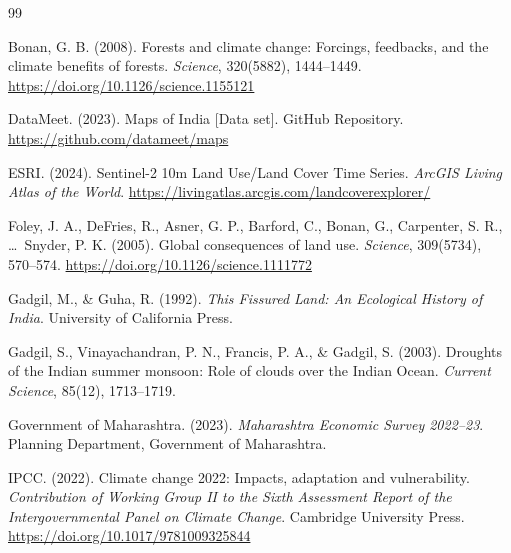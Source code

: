 \documentclass[12pt,a4paper]{article}
\begin{document}
\newpage


\begin{thebibliography}{99}

Bonan, G. B. (2008).
\newblock Forests and climate change: Forcings, feedbacks, and the climate benefits of forests.
\newblock \textit{Science}, 320(5882), 1444--1449.
\newblock \url{https://doi.org/10.1126/science.1155121}

DataMeet. (2023).
\newblock Maps of India [Data set].
\newblock GitHub Repository. \url{https://github.com/datameet/maps}

ESRI. (2024).
\newblock Sentinel-2 10m Land Use/Land Cover Time Series.
\newblock \textit{ArcGIS Living Atlas of the World}. \url{https://livingatlas.arcgis.com/landcoverexplorer/}

Foley, J. A., DeFries, R., Asner, G. P., Barford, C., Bonan, G., Carpenter, S. R., \ldots\ Snyder, P. K. (2005).
\newblock Global consequences of land use.
\newblock \textit{Science}, 309(5734), 570--574.
\newblock \url{https://doi.org/10.1126/science.1111772}

Gadgil, M., \& Guha, R. (1992).
\newblock \textit{This Fissured Land: An Ecological History of India}.
\newblock University of California Press.

Gadgil, S., Vinayachandran, P. N., Francis, P. A., \& Gadgil, S. (2003).
\newblock Droughts of the Indian summer monsoon: Role of clouds over the Indian Ocean.
\newblock \textit{Current Science}, 85(12), 1713--1719.

Government of Maharashtra. (2023).
\newblock \textit{Maharashtra Economic Survey 2022--23}.
\newblock Planning Department, Government of Maharashtra.

IPCC. (2022).
\newblock Climate change 2022: Impacts, adaptation and vulnerability.
\newblock \textit{Contribution of Working Group II to the Sixth Assessment Report of the Intergovernmental Panel on Climate Change}. Cambridge University Press.
\newblock \url{https://doi.org/10.1017/9781009325844}


\end{thebibliography}
\end{document}
